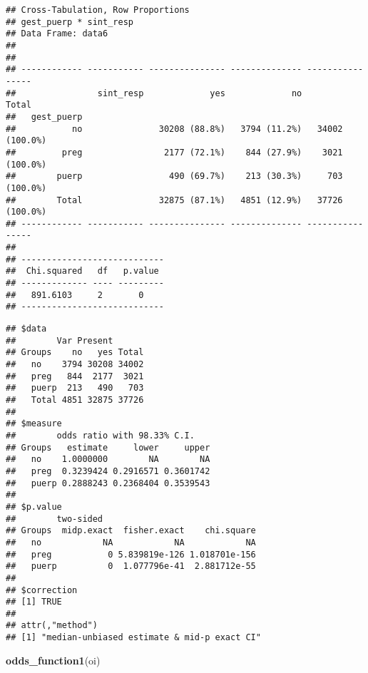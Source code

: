 \documentclass[
]{article}
\newenvironment{Shaded}{\begin{snugshade}}{\end{snugshade}}
\newcommand{\KeywordTok}[1]{\textcolor[rgb]{0.13,0.29,0.53}{\textbf{#1}}}
\newcommand{\NormalTok}[1]{#1}
\newcommand{\OperatorTok}[1]{\textcolor[rgb]{0.81,0.36,0.00}{\textbf{#1}}}
\newcommand{\StringTok}[1]{\textcolor[rgb]{0.31,0.60,0.02}{#1}}
\begin{document}
\begin{verbatim}
## Cross-Tabulation, Row Proportions  
## gest_puerp * sint_resp  
## Data Frame: data6  
## 
## 
## ------------ ----------- --------------- -------------- ----------------
##                sint_resp             yes             no            Total
##   gest_puerp                                                            
##           no               30208 (88.8%)   3794 (11.2%)   34002 (100.0%)
##         preg                2177 (72.1%)    844 (27.9%)    3021 (100.0%)
##        puerp                 490 (69.7%)    213 (30.3%)     703 (100.0%)
##        Total               32875 (87.1%)   4851 (12.9%)   37726 (100.0%)
## ------------ ----------- --------------- -------------- ----------------
## 
## ----------------------------
##  Chi.squared   df   p.value 
## ------------- ---- ---------
##   891.6103     2       0    
## ----------------------------
\end{verbatim}

\begin{Shaded}
\end{Shaded}

\begin{verbatim}
## $data
##        Var Present
## Groups    no   yes Total
##   no    3794 30208 34002
##   preg   844  2177  3021
##   puerp  213   490   703
##   Total 4851 32875 37726
## 
## $measure
##        odds ratio with 98.33% C.I.
## Groups   estimate     lower     upper
##   no    1.0000000        NA        NA
##   preg  0.3239424 0.2916571 0.3601742
##   puerp 0.2888243 0.2368404 0.3539543
## 
## $p.value
##        two-sided
## Groups  midp.exact  fisher.exact    chi.square
##   no            NA            NA            NA
##   preg           0 5.839819e-126 1.018701e-156
##   puerp          0  1.077796e-41  2.881712e-55
## 
## $correction
## [1] TRUE
## 
## attr(,"method")
## [1] "median-unbiased estimate & mid-p exact CI"
\end{verbatim}

\begin{Shaded}
\begin{Highlighting}[]
\KeywordTok{odds_function1}\NormalTok{(oi)}
\end{Highlighting}
\end{Shaded}
\end{document}
